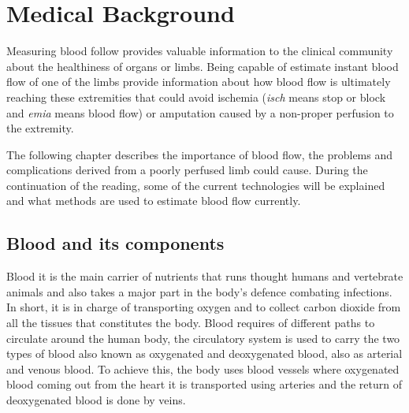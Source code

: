 
\chapter{Medical Background}

\ifpdf
    \graphicspath{{Chapter2/Figs/Raster/}{Chapter2/Figs/PDF/}{Chapter2/Figs/}}
\else
    \graphicspath{{Chapter2/Figs/Vector/}{Chapter2/Figs/}}
\fi



Measuring blood follow provides valuable information to the clinical community about the healthiness of organs or limbs. Being capable of estimate instant blood flow of one of the limbs provide information about how blood flow is ultimately reaching these extremities that could avoid ischemia (\textit{isch} means stop or block and \textit{emia} means blood flow) or amputation caused by a non-proper perfusion to the extremity. 

The following chapter describes the importance of blood flow, the problems and complications derived from a poorly perfused limb could cause. During the continuation of the reading, some of the current technologies will be explained and what methods are used to estimate blood flow currently.  

\section{Blood and its components} %
Blood it is the main carrier of nutrients that runs thought humans and vertebrate animals and also takes a major part in the body's defence combating infections. In short, it is in charge of transporting oxygen and to collect carbon dioxide from all the tissues that constitutes the body.  Blood requires of different paths to circulate around the human body, the circulatory system is used to carry the two types of blood also known as oxygenated and deoxygenated blood, also as arterial and venous blood. To achieve this, the body uses blood vessels where oxygenated blood coming out from the heart it is transported using arteries and the return of deoxygenated blood is done by veins.  
